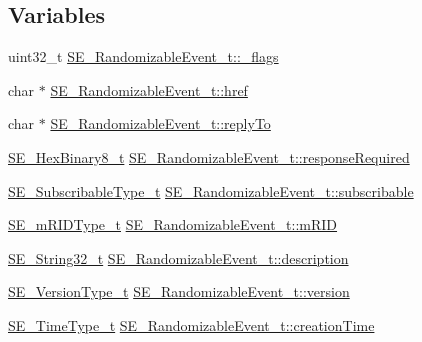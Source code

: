 \subsection*{Variables}
\begin{DoxyCompactItemize}
\item 
uint32\+\_\+t \hyperlink{group__RandomizableEvent_ga44a38708b02c27229ecb4d5e2b7c03d3}{S\+E\+\_\+\+Randomizable\+Event\+\_\+t\+::\+\_\+flags}
\item 
char $\ast$ \hyperlink{group__RandomizableEvent_gae0c85b4710c2a67d48903e469e902161}{S\+E\+\_\+\+Randomizable\+Event\+\_\+t\+::href}
\item 
char $\ast$ \hyperlink{group__RandomizableEvent_ga19e78ab6dd368078b3d4bb1702682e2b}{S\+E\+\_\+\+Randomizable\+Event\+\_\+t\+::reply\+To}
\item 
\hyperlink{group__HexBinary8_gaecf2dab3615fb954a693c017a61f77d6}{S\+E\+\_\+\+Hex\+Binary8\+\_\+t} \hyperlink{group__RandomizableEvent_ga20fb6d1e039d742368e1025e2103aeab}{S\+E\+\_\+\+Randomizable\+Event\+\_\+t\+::response\+Required}
\item 
\hyperlink{group__SubscribableType_ga5c41f553d369710ed34619266bf2551e}{S\+E\+\_\+\+Subscribable\+Type\+\_\+t} \hyperlink{group__RandomizableEvent_gaed50030cccbadde5ca606e7eb27cf4dd}{S\+E\+\_\+\+Randomizable\+Event\+\_\+t\+::subscribable}
\item 
\hyperlink{group__mRIDType_gac74622112f3a388a2851b2289963ba5e}{S\+E\+\_\+m\+R\+I\+D\+Type\+\_\+t} \hyperlink{group__RandomizableEvent_ga2e2218e01dc1e3dd2428ced1eaaf0c3c}{S\+E\+\_\+\+Randomizable\+Event\+\_\+t\+::m\+R\+ID}
\item 
\hyperlink{group__String32_gac9f59b06b168b4d2e0d45ed41699af42}{S\+E\+\_\+\+String32\+\_\+t} \hyperlink{group__RandomizableEvent_ga5ea5add0530a0829d95aad1326f7df9b}{S\+E\+\_\+\+Randomizable\+Event\+\_\+t\+::description}
\item 
\hyperlink{group__VersionType_ga4b8d27838226948397ed99f67d46e2ae}{S\+E\+\_\+\+Version\+Type\+\_\+t} \hyperlink{group__RandomizableEvent_ga4aff0ff7df5bffb212069832a6e7387b}{S\+E\+\_\+\+Randomizable\+Event\+\_\+t\+::version}
\item 
\hyperlink{group__TimeType_ga6fba87a5b57829b4ff3f0e7638156682}{S\+E\+\_\+\+Time\+Type\+\_\+t} \hyperlink{group__RandomizableEvent_gadf7708c10d4b88cd791c61a0fcd5975b}{S\+E\+\_\+\+Randomizable\+Event\+\_\+t\+::creation\+Time}
\item 
\mbox{\label{group__RandomizableEvent_gab71ad9477e2bdc8d8f84d898775ce535}} 

\end{DoxyCompactItemize}
